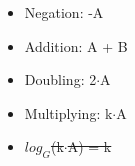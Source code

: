 \begin{itemize}
  \item Negation: -A
  \item Addition: A + B
  \item Doubling: 2$\cdot$A
  \item Multiplying: k$\cdot$A
  \item \sout{$log_{G}$(k$\cdot$A) = k}
\end{itemize}

